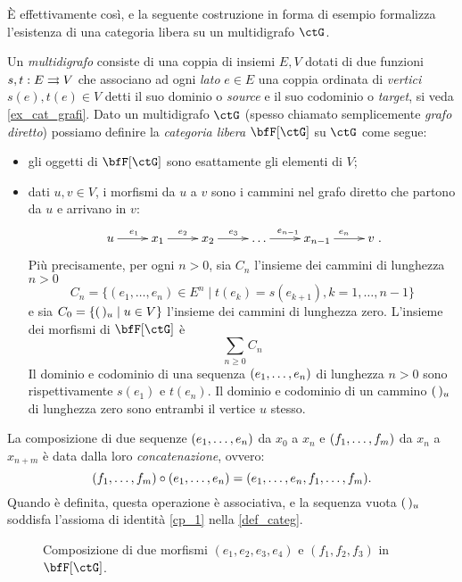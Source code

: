 \`E effettivamente così, e la seguente costruzione in forma di esempio formalizza l'esistenza di una categoria libera su un multidigrafo \(\ctG\).
\begin{example}\label{ex_cat_libera}
	Un \emph{multidigrafo} consiste di una coppia di insiemi \(E,V\) dotati di due funzioni \(s,t : E\rightrightarrows V\) che associano ad ogni \emph{lato} \(e\in E\) una coppia ordinata di \emph{vertici} \(s(e),t(e)\in V\) detti il suo dominio o \emph{source} e il suo codominio o \emph{target}, si veda \ref{ex_cat_grafi}. Dato un multidigrafo \(\ctG\) (spesso chiamato semplicemente \emph{grafo diretto}) possiamo definire la \emph{categoria libera} \(\bfF[\ctG]\) su \(\ctG\) come segue:
	\begin{itemize}
		\item gli oggetti di \(\bfF[\ctG]\) sono esattamente gli elementi di \(V\);
		\item dati \(u,v\in V\), i morfismi da \(u\) a \(v\) sono i cammini nel grafo diretto che partono da \(u\) e arrivano in \(v\):
		      \[\xymatrix{u \ar[r]^{e_1}& x_1 \ar[r]^{e_2}& x_2\ar[r]^{e_3}& \dots\ar[r]^{e_{n-1}}& x_{n-1}\ar[r]^{e_n}& v}.\]
		      Più precisamente, per ogni \(n>0\), sia \(C_n\) l'insieme dei cammini di lunghezza \(n>0\)
		      \[C_n=\{(e_1,\ldots,e_n)\in E^n \mid t(e_k)=s(e_{k+1}), k=1,\ldots,n-1\}\]
		      e sia \(C_0=\{(\,)_u \mid u\in V\}\) l'insieme dei cammini di lunghezza zero.
		      L'insieme dei morfismi di \(\bfF[\ctG]\) è
		      \[\sum_{n\ge0}C_n\]
		      Il dominio e codominio di una sequenza \((\tup en,)\) di lunghezza \(n>0\) sono rispettivamente \(s(e_1)\) e \(t(e_n)\).
		      Il dominio e codominio di un cammino \((\,)_u\) di lunghezza zero sono entrambi il vertice \(u\) stesso.
	\end{itemize}
	La composizione di due sequenze \((\tup en,)\) da \(x_0\) a \(x_n\) e \((\tup fm,)\) da \(x_n\) a \(x_{n+m}\) è data dalla loro \emph{concatenazione}, ovvero:
	\[(\tup fm,)\cmp(\tup en,) = (\tup en, , \tup fm,).\]
	Quando è definita, questa operazione è associativa, e la sequenza vuota \((\,)_u\) soddisfa l'assioma di identità \ref{cp_1} nella \ref{def_categ}.
	\begin{figure}
		\begin{center}
		\end{center}
		\caption{Composizione di due morfismi \((e_1,e_2,e_3,e_4)\) e \((f_1,f_2,f_3)\) in \(\bfF[\ctG]\).}
		\label{fig:enter-label}
	\end{figure}
\end{example}
